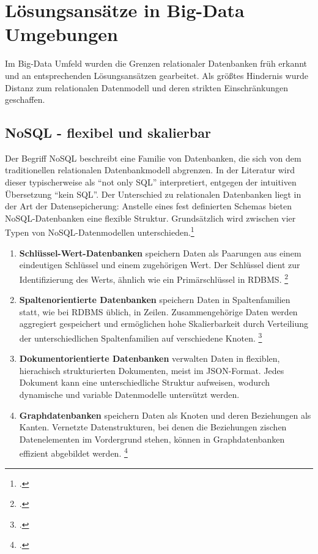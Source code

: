 \section{Lösungsansätze in Big-Data Umgebungen}

Im Big-Data Umfeld wurden die Grenzen relationaler Datenbanken früh erkannt und an entsprechenden Lösungsansätzen gearbeitet. Als größtes Hindernis wurde Distanz zum relationalen Datenmodell und deren strikten Einschränkungen geschaffen.

\subsection{NoSQL - flexibel und skalierbar}

Der Begriff NoSQL beschreibt eine Familie von Datenbanken, die sich von dem traditionellen relationalen Datenbankmodell abgrenzen. In der Literatur wird dieser typischerweise als \enquote{not only SQL} interpretiert, entgegen der intuitiven Übersetzung \enquote{kein SQL}. Der Unterschied zu relationalen Datenbanken liegt in der Art der Datensepicherung: Anstelle eines fest definierten Schemas bieten NoSQL-Datenbanken eine flexible Struktur. Grundsätzlich wird zwischen vier Typen von NoSQL-Datenmodellen unterschieden.\footcite[S. 1 f.]{schreinerWhenRelationalBasedApplications2019}

\begin{enumerate}[nosep]
    \item \textbf{Schlüssel-Wert-Datenbanken} speichern Daten als Paarungen aus einem eindeutigen Schlüssel und einem zugehörigen Wert. Der Schlüssel dient zur Identifizierung des Werts, ähnlich wie ein Primärschlüssel in RDBMS. \footcite[S. 2]{wangSQLVsNoSQL2017}
    \item \textbf{Spaltenorientierte Datenbanken} speichern Daten in Spaltenfamilien statt, wie bei RDBMS üblich, in Zeilen. Zusammengehörige Daten werden aggregiert gespeichert und ermöglichen hohe Skalierbarkeit durch Verteiliung der unterschiedlichen Spaltenfamilien auf verschiedene Knoten. \footcite{}
    \item \textbf{Dokumentorientierte Datenbanken} verwalten Daten in flexiblen, hierachisch strukturierten Dokumenten, meist im JSON-Format. Jedes Dokument kann eine unterschiedliche Struktur aufweisen, wodurch dynamische und variable Datenmodelle untersützt werden.
    \item \textbf{Graphdatenbanken} speichern Daten als Knoten und deren Beziehungen als Kanten. Vernetzte Datenstrukturen, bei denen die Beziehungen zischen Datenelementen im Vordergrund stehen, können in Graphdatenbanken effizient abgebildet werden. \footcite{}
\end{enumerate}

